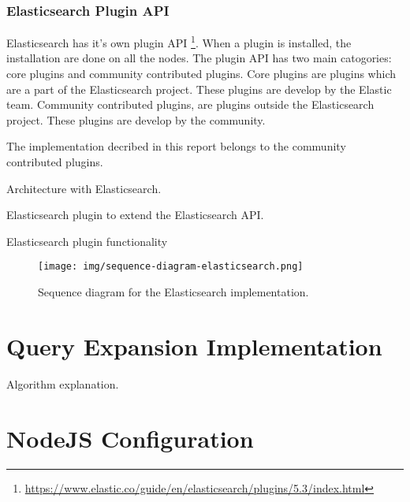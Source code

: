 \subsubsection{Elasticsearch Plugin API}
Elasticsearch has it's own plugin API \footnote{\url{https://www.elastic.co/guide/en/elasticsearch/plugins/5.3/index.html}}.
When a plugin is installed, the installation are done on all the nodes.
The plugin API has two main catogories: core plugins and community contributed plugins.
Core plugins are plugins which are a part of the Elasticsearch project.
These plugins are develop by the Elastic team.
Community contributed plugins, are plugins outside the Elasticsearch project.
These plugins are develop by the community.

The implementation decribed in this report belongs to the community contributed plugins.


Architecture with Elasticsearch.

Elasticsearch plugin to extend the Elasticsearch API.

Elasticsearch plugin functionality

\begin{figure}[h!]
\centering \texttt{[image: img/sequence-diagram-elasticsearch.png]}
\caption{Sequence diagram for the Elasticsearch implementation.}
\label{fig:sequence-diagram-lucene}
\end{figure}

\section{Query Expansion Implementation}
Algorithm explanation.

\section{NodeJS Configuration}
